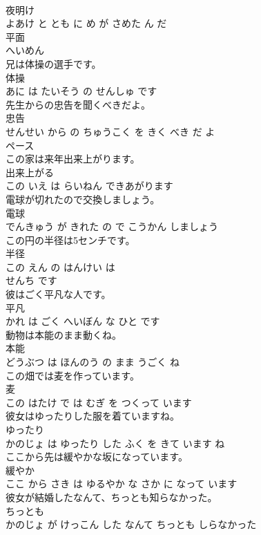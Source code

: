 \documentclass[8pt]{extreport}
\begin{document}
\begin{CJK}{UTF8}{min}
\\	夜明け 
\\	よあけ と とも に め が さめた ん だ			
\\	平面	
\\	へいめん		
\\	兄は体操の選手です。	
\\	体操 
\\	あに は たいそう の せんしゅ です			
\\	先生からの忠告を聞くべきだよ。	
\\	忠告 
\\	せんせい から の ちゅうこく を きく べき だ よ			
\\	ペース	
\\	この家は来年出来上がります。	
\\	出来上がる 
\\	この いえ は らいねん できあがります			
\\	電球が切れたので交換しましょう。	
\\	電球 
\\	でんきゅう が きれた の で こうかん しましょう			
\\	この円の半径は5センチです。	
\\	半径 
\\	この えん の はんけい は 
\\	せんち です			
\\	彼はごく平凡な人です。	
\\	平凡 
\\	かれ は ごく へいぼん な ひと です			
\\	動物は本能のまま動くね。	
\\	本能 
\\	どうぶつ は ほんのう の まま うごく ね			
\\	この畑では麦を作っています。	
\\	麦 
\\	この はたけ で は むぎ を つくって います			
\\	彼女はゆったりした服を着ていますね。	
\\	ゆったり 
\\	かのじょ は ゆったり した ふく を きて います ね			
\\	ここから先は緩やかな坂になっています。	
\\	緩やか 
\\	ここ から さき は ゆるやか な さか に なって います			
\\	彼女が結婚したなんて、ちっとも知らなかった。	
\\	ちっとも 
\\	かのじょ が けっこん した なんて ちっとも しらなかった			

\end{CJK}
\end{document}
